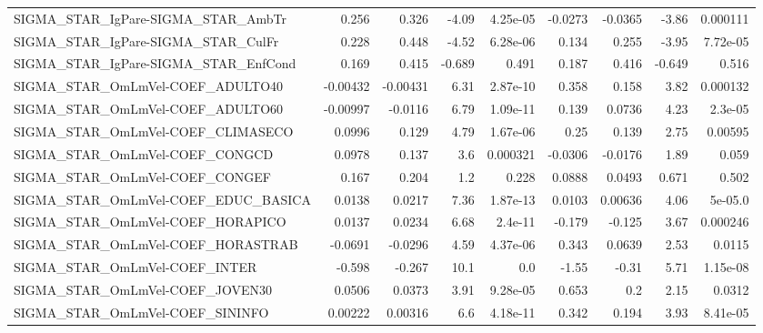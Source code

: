 \begin{tabular}{lrrrrrrrr}
SIGMA\_STAR\_IgPare-SIGMA\_STAR\_AmbTr    &       0.256 &        0.326 &   -4.09 & 4.25e-05 &    -0.0273 &     -0.0365 &        -3.86 &      0.000111 \\
SIGMA\_STAR\_IgPare-SIGMA\_STAR\_CulFr    &       0.228 &        0.448 &   -4.52 & 6.28e-06 &      0.134 &       0.255 &        -3.95 &      7.72e-05 \\
SIGMA\_STAR\_IgPare-SIGMA\_STAR\_EnfCond  &       0.169 &        0.415 &  -0.689 &    0.491 &      0.187 &       0.416 &       -0.649 &         0.516 \\
SIGMA\_STAR\_OmLmVel-COEF\_ADULTO40      &    -0.00432 &     -0.00431 &    6.31 & 2.87e-10 &      0.358 &       0.158 &         3.82 &      0.000132 \\
SIGMA\_STAR\_OmLmVel-COEF\_ADULTO60      &    -0.00997 &      -0.0116 &    6.79 & 1.09e-11 &      0.139 &      0.0736 &         4.23 &       2.3e-05 \\
SIGMA\_STAR\_OmLmVel-COEF\_CLIMASECO     &      0.0996 &        0.129 &    4.79 & 1.67e-06 &       0.25 &       0.139 &         2.75 &       0.00595 \\
SIGMA\_STAR\_OmLmVel-COEF\_CONGCD        &      0.0978 &        0.137 &     3.6 & 0.000321 &    -0.0306 &     -0.0176 &         1.89 &         0.059 \\
SIGMA\_STAR\_OmLmVel-COEF\_CONGEF        &       0.167 &        0.204 &     1.2 &    0.228 &     0.0888 &      0.0493 &        0.671 &         0.502 \\
SIGMA\_STAR\_OmLmVel-COEF\_EDUC\_BASICA   &      0.0138 &       0.0217 &    7.36 & 1.87e-13 &     0.0103 &     0.00636 &         4.06 &       5e-05.0 \\
SIGMA\_STAR\_OmLmVel-COEF\_HORAPICO      &      0.0137 &       0.0234 &    6.68 &  2.4e-11 &     -0.179 &      -0.125 &         3.67 &      0.000246 \\
SIGMA\_STAR\_OmLmVel-COEF\_HORASTRAB     &     -0.0691 &      -0.0296 &    4.59 & 4.37e-06 &      0.343 &      0.0639 &         2.53 &        0.0115 \\
SIGMA\_STAR\_OmLmVel-COEF\_INTER         &      -0.598 &       -0.267 &    10.1 &      0.0 &      -1.55 &       -0.31 &         5.71 &      1.15e-08 \\
SIGMA\_STAR\_OmLmVel-COEF\_JOVEN30       &      0.0506 &       0.0373 &    3.91 & 9.28e-05 &      0.653 &         0.2 &         2.15 &        0.0312 \\
SIGMA\_STAR\_OmLmVel-COEF\_SININFO       &     0.00222 &      0.00316 &     6.6 & 4.18e-11 &      0.342 &       0.194 &         3.93 &      8.41e-05 \\

\end{tabular}
